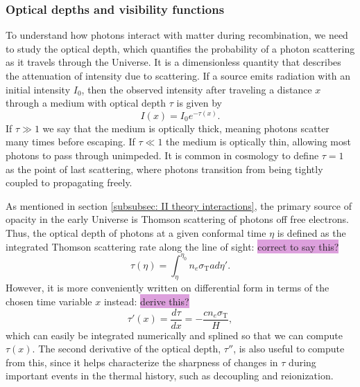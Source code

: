 \documentclass{aa}
\numberwithin{equation}{section}
\numberwithin{table}{section}
\numberwithin{figure}{section}
\begin{document}
\subsubsection{Optical depths and visibility functions}\label{subsubsec: II theory optical depth}

To understand how photons interact with matter during recombination, we need to study the optical depth, which quantifies the probability of a photon scattering as it travels through the Universe. 
It is a dimensionless quantity that describes the attenuation of intensity due to scattering. If a source emits radiation with an initial intensity $I_0$, then the observed intensity after traveling a distance $x$ through a medium with optical depth $\tau$ is given by
\begin{equation} 
  I(x) = I_0 e^{-\tau(x)}. 
\end{equation} 
If $\tau\gg1$ we say that the medium is optically thick, meaning photons scatter many times before escaping. If $\tau\ll1$ the medium is optically thin, allowing most photons to pass through unimpeded. It is common in cosmology to define $\tau=1$ as the point of last scattering, where photons transition from being tightly coupled to propagating freely.

As mentioned in section \ref{subsubsec: II theory interactions}, the primary source of opacity in the early Universe is Thomson scattering of photons off free electrons. Thus, the optical depth of photons at a given conformal time $\eta$ is defined as the integrated Thomson scattering rate along the line of sight: \colorbox{Plum}{correct to say this?} 
\begin{equation}
  \tau(\eta) = \int_{\eta}^{\eta_0}n_e\sigma_\text{T}ad\eta'.
\end{equation}
However, it is more conveniently written on differential form in terms of the chosen time variable $x$ instead: \colorbox{Plum}{derive this?}
\begin{equation}
  \tau'(x) = \frac{d\tau}{dx} = -\frac{c n_e \sigma_\text{T}}{H}, \label{eq: optical depth deriv}
\end{equation}
which can easily be integrated numerically and splined so that we can compute $\tau(x)$. The second derivative of the optical depth, $\tau''$, is also useful to compute from this, since it helps characterize the sharpness of changes in $\tau$ during important events in the thermal history, such as decoupling and reionization. 
\end{document}
